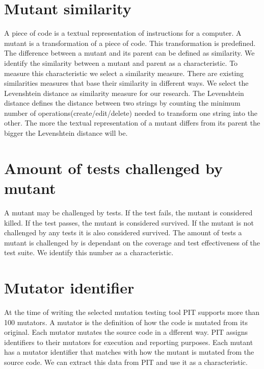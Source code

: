 \documentclass[../main]{subfiles}
\begin{document}
\section{Mutant similarity}
A piece of code is a textual representation of instructions for a computer.
A mutant is a transformation of a piece of code.
This transformation is predefined.
The difference between a mutant and its parent can be defined as similarity.
We identify the similarity between a mutant and parent as a characteristic.
\newline
To measure this characteristic we select a similarity measure.
There are existing similarities measures that base their similarity in different ways\cite{Gomma2013AApproaches}. 
We select the Levenshtein distance as similarity measure for our research\cite{Gomma2013AApproaches}.
The Levenshtein distance defines the distance between two strings by counting the minimum number of operations(create/edit/delete) needed to transform one string into the other\cite{Gomma2013AApproaches}.
The more the textual representation of a mutant differs from its parent the bigger the Levenshtein distance will be.

\section{Amount of tests challenged by mutant}
A mutant may be challenged by tests.
If the test fails, the mutant is considered killed.
If the test passes, the mutant is considered survived.
If the mutant is not challenged by any tests it is also considered survived.
The amount of tests a mutant is challenged by is dependant on the coverage and test effectiveness of the test suite.
We identify this number as a characteristic.

\section{Mutator identifier}
At the time of writing the selected mutation testing tool PIT supports more than 100 mutators\cite{pitestMutators}.
A mutator is the definition of how the code is mutated from its original\cite{Offutt2001}.
Each mutator mutates the source code in a dfferent way.
PIT assigns identifiers to their mutators for execution and reporting purposes. 
Each mutant has a mutator identifier that matches with how the mutant is mutated from the source code.
We can extract this data from PIT and use it as a characteristic.
\end{document}
